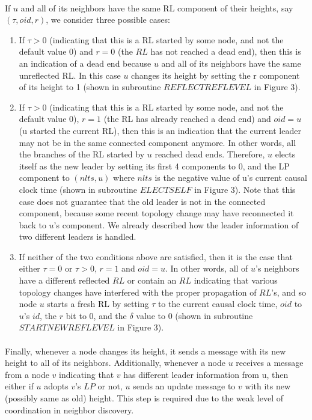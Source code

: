 \paragraph{}If $u$ and all of its neighbors have the same RL component of their heights, say $(\tau, oid, r)$, we consider three possible cases:
\begin{enumerate}
	\item If $\tau > 0$ (indicating that this is a RL started by some node, and not the default value 0) and $r = 0$ (the $RL$ has not reached a dead end), then this is an indication of a dead end because $u$ and all of its neighbors have the same unreflected RL. In this case $u$ changes its height by setting the r component of its height to 1 (shown in subroutine $REFLECTREFLEVEL$ in Figure 3).
	\item If $\tau > 0$ (indicating that this is a RL started by some node, and not the default value 0), $r = 1$ (the RL has already reached a dead end) and $oid = u$ (u started the current RL), then this is an indication that the current leader may not be in the same connected component anymore. In other words, all the branches of the RL started by $u$ reached dead ends. Therefore, $u$ elects itself as the new leader by setting its first 4 components to 0, and the LP component to $(nlts, u)$ where $nlts$ is the negative value of u’s current causal clock time (shown in subroutine $ELECTSELF$ in Figure 3). Note that this case does not guarantee that the old leader is not in the connected component, because some recent topology change may have reconnected it back to $u$’s component. We already described how the leader information of two different leaders is handled.
	\item If neither of the two conditions above are satisfied, then it is the case that either $\tau = 0$ or $\tau > 0$, $r = 1$ and $oid = u$. In other words, all of $u$’s neighbors have a different reflected $RL$ or contain an $RL$ indicating that various topology changes have interfered with the proper propagation of $RL$’s, and so node $u$ starts a fresh RL by setting $\tau$ to the current causal clock time, $oid$ to $u$’s $id$, the $r$ bit to $0$, and the $\delta$ value to $0$ (shown in subroutine $STARTNEWREFLEVEL$ in Figure 3).
\end{enumerate}
\paragraph{}Finally, whenever a node changes its height, it sends a message with its new height to all of its neighbors. Additionally, whenever a node $u$ receives a message from a node $v$ indicating that $v$ has different leader information from u, then either if $u$ adopts $v$’s $LP$ or not, $u$ sends an update message to $v$ with its new (possibly same as old) height. This step is required due to the weak level of coordination in neighbor discovery.
